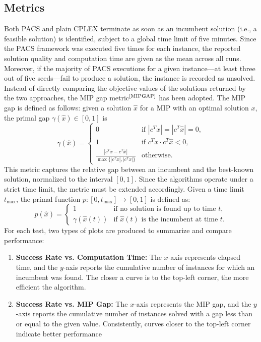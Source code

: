 \subsection{Metrics}
Both PACS and plain CPLEX terminate as soon as an incumbent solution (i.e., a feasible solution) is identified, subject to a global time limit of five minutes.
Since the PACS framework was executed five times for each instance, the reported solution quality and computation time are given as the mean across all runs.
Moreover, if the majority of PACS executions for a given instance---at least three out of five seeds---fail to produce a solution, the instance is recorded as unsolved.
Instead of directly comparing the objective values of the solutions returned by the two approaches, the MIP gap metric$^\text{\cite{MIPGAP}}$ has been adopted. The MIP gap is defined as follows: given a solution $\hat{x}$ for a MIP with an optimal solution $x$, the primal gap $\gamma(\hat{x}) \in [0,1]$ is
\begin{equation}
\gamma(\hat{x}) =
\begin{cases}
0 & \text{if } |c^T x| = |c^T \hat{x}| = 0, \\
1 & \text{if } c^T x \cdot c^T \hat{x}< 0, \\
\frac{|c^T x-c^T \hat{x}|}{\max\{|c^T \hat{x}|, |c^T x|\}} & \text{otherwise}.
\end{cases}
\end{equation}
This metric captures the relative gap between an incumbent and the best-known solution, normalized to the interval $[0,1]$.  
Since the algorithms operate under a strict time limit, the metric must be extended accordingly. Given a time limit $t_{\max}$, the primal function $p:[0,t_{\max}] \to [0,1]$ is defined as:
\begin{equation}
p(\hat{x}) =
\begin{cases}
1 & \text{if no solution is found up to time $t$}, \\
\gamma(\hat{x}(t)) & \text{if $\hat{x}(t)$ is the incumbent at time $t$}.
\end{cases}
\end{equation}
For each test, two types of plots are produced to summarize and compare performance:
\begin{enumerate}
    \item \textbf{Success Rate vs. Computation Time:}  
    The $x$-axis represents elapsed time, and the $y$-axis reports the cumulative number of instances for which an incumbent was found. The closer a curve is to the top-left corner, the more efficient the algorithm.  
    \item \textbf{Success Rate vs. MIP Gap:}  
    The $x$-axis represents the MIP gap, and the $y$-axis reports the cumulative number of instances solved with a gap less than or equal to the given value. Consistently, curves closer to the top-left corner indicate better performance 
\end{enumerate}

